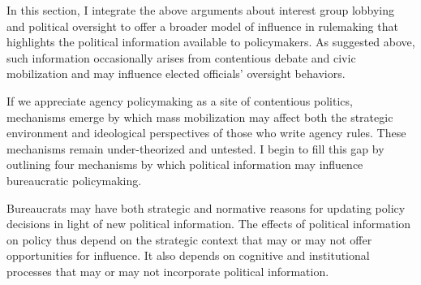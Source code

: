 In this section, I integrate the above arguments about interest group lobbying and political oversight to offer a broader model of influence in rulemaking that highlights the political information available to policymakers. As suggested above, such information occasionally arises from contentious debate and civic mobilization and may influence elected officials' oversight behaviors. %

If we appreciate agency policymaking as a site of contentious politics, mechanisms emerge by which mass mobilization may affect both the strategic environment and ideological perspectives of those who write agency rules. These mechanisms remain under-theorized and untested. I begin to fill this gap by outlining four mechanisms by which political information may influence bureaucratic policymaking. 

Bureaucrats may have both strategic and normative reasons for updating policy decisions in light of new political information. The effects of political information on policy thus depend on the strategic context that may or may not offer opportunities for influence. It also depends on cognitive and institutional processes that may or may not incorporate political information.



